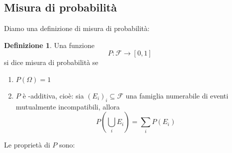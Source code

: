 \documentclass{article}
\theoremstyle{plain}
\theoremstyle{definition}
\newtheorem{definizione}{Definizione}[section]
\theoremstyle{remark}
\begin{document}
\subsection{Misura di probabilità} %
\label{sub:misura_di_probabilità}
Diamo una definizione di misura di probabilità:
\begin{definizione}
	Una funzione
	\begin{equation*}
		P\colon\mathscr{F}\to[0,1]
	\end{equation*}
	si dice misura di probabilità se
	\begin{enumerate}
		\item $P(\Omega)=1$
		\item $P$ è \sigma-additiva, cioè: sia $(E_i)_i\subseteq\mathscr{F}$ una famiglia numerabile di eventi mutualmente incompatibili, allora
		\begin{equation*}
			P(\bigcup_i E_i)=\sum_i P(E_i)
		\end{equation*}
	\end{enumerate}
\end{definizione}
Le proprietà di $P$ sono:
\end{document}
